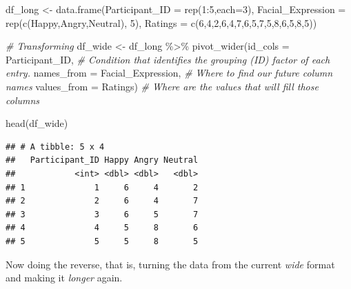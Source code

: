 \documentclass[
]{book}
\newenvironment{Shaded}{\begin{snugshade}}{\end{snugshade}}
\newcommand{\AttributeTok}[1]{\textcolor[rgb]{0.77,0.63,0.00}{#1}}
\newcommand{\CommentTok}[1]{\textcolor[rgb]{0.56,0.35,0.01}{\textit{#1}}}
\newcommand{\DecValTok}[1]{\textcolor[rgb]{0.00,0.00,0.81}{#1}}
\newcommand{\FunctionTok}[1]{\textcolor[rgb]{0.00,0.00,0.00}{#1}}
\newcommand{\NormalTok}[1]{#1}
\newcommand{\OtherTok}[1]{\textcolor[rgb]{0.56,0.35,0.01}{#1}}
\newcommand{\SpecialCharTok}[1]{\textcolor[rgb]{0.00,0.00,0.00}{#1}}
\newcommand{\StringTok}[1]{\textcolor[rgb]{0.31,0.60,0.02}{#1}}
\begin{document}
\begin{Shaded}
\begin{Highlighting}[]
\NormalTok{df\_long }\OtherTok{\textless{}{-}} \FunctionTok{data.frame}\NormalTok{(}\AttributeTok{Participant\_ID =} \FunctionTok{rep}\NormalTok{(}\DecValTok{1}\SpecialCharTok{:}\DecValTok{5}\NormalTok{,}\AttributeTok{each=}\DecValTok{3}\NormalTok{),}
                      \AttributeTok{Facial\_Expression =} \FunctionTok{rep}\NormalTok{(}\FunctionTok{c}\NormalTok{(}\StringTok{\textquotesingle{}Happy\textquotesingle{}}\NormalTok{,}\StringTok{\textquotesingle{}Angry\textquotesingle{}}\NormalTok{,}\StringTok{\textquotesingle{}Neutral\textquotesingle{}}\NormalTok{), }\DecValTok{5}\NormalTok{),}
                      \AttributeTok{Ratings =} \FunctionTok{c}\NormalTok{(}\DecValTok{6}\NormalTok{,}\DecValTok{4}\NormalTok{,}\DecValTok{2}\NormalTok{,}\DecValTok{6}\NormalTok{,}\DecValTok{4}\NormalTok{,}\DecValTok{7}\NormalTok{,}\DecValTok{6}\NormalTok{,}\DecValTok{5}\NormalTok{,}\DecValTok{7}\NormalTok{,}\DecValTok{5}\NormalTok{,}\DecValTok{8}\NormalTok{,}\DecValTok{6}\NormalTok{,}\DecValTok{5}\NormalTok{,}\DecValTok{8}\NormalTok{,}\DecValTok{5}\NormalTok{))}

\CommentTok{\# Transforming}
\NormalTok{df\_wide }\OtherTok{\textless{}{-}}\NormalTok{ df\_long }\SpecialCharTok{\%\textgreater{}\%} 
  \FunctionTok{pivot\_wider}\NormalTok{(}\AttributeTok{id\_cols =}\NormalTok{ Participant\_ID,  }\CommentTok{\# Condition that identifies the grouping (ID) factor of each entry.}
              \AttributeTok{names\_from =}\NormalTok{ Facial\_Expression,  }\CommentTok{\# Where to find our future column names}
              \AttributeTok{values\_from =}\NormalTok{ Ratings)   }\CommentTok{\# Where are the values that will fill those columns }


\FunctionTok{head}\NormalTok{(df\_wide)}
\end{Highlighting}
\end{Shaded}

\begin{verbatim}
## # A tibble: 5 x 4
##   Participant_ID Happy Angry Neutral
##            <int> <dbl> <dbl>   <dbl>
## 1              1     6     4       2
## 2              2     6     4       7
## 3              3     6     5       7
## 4              4     5     8       6
## 5              5     5     8       5
\end{verbatim}

Now doing the reverse, that is, turning the data from the current \emph{wide} format and making it \emph{longer} again.
\end{document}
